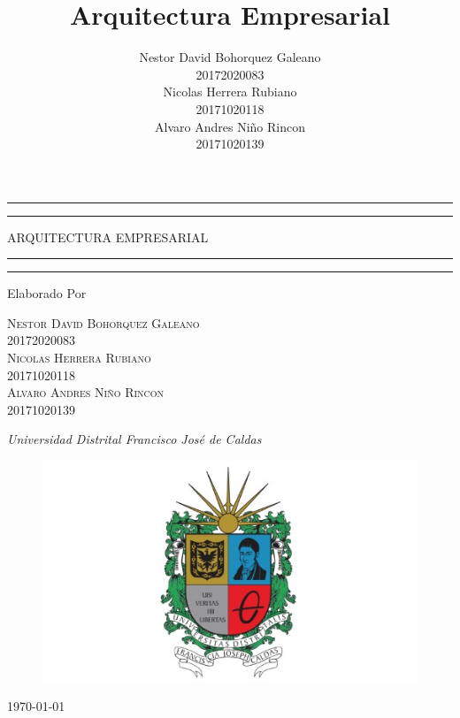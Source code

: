 \documentclass[11pt]{book}
\author{
	Nestor David Bohorquez Galeano \\ 
	20172020083 \\
	Nicolas Herrera Rubiano \\
	20171020118 \\
	Alvaro Andres Niño Rincon \\
	20171020139	
}
\title{Arquitectura Empresarial}
\begin{document}

\begin{titlepage} %
	
	\centering
	\scshape %
	\vspace*{\baselineskip} %
	
	\rule{\textwidth}{1.6pt}\vspace*{-\baselineskip}\vspace*{2pt} %
	\rule{\textwidth}{0.4pt} %
	
	\vspace{0.75\baselineskip}
	
	{\LARGE ARQUITECTURA EMPRESARIAL} %
	
	\vspace{0.75\baselineskip}
	
	\rule{\textwidth}{0.4pt}\vspace*{-\baselineskip}\vspace{3.2pt} %
	\rule{\textwidth}{1.6pt} %
	
	\vspace{2\baselineskip}
	
	\vspace*{3\baselineskip}
	
	Elaborado Por
	
	\vspace{0.5\baselineskip} 
	
	{\scshape\Large Nestor David Bohorquez Galeano \\ 20172020083 \\ 
	Nicolas Herrera Rubiano \\ 20171020118 \\ 
	Alvaro Andres Niño Rincon \\ 20171020139}
	
	\vspace{0.5\baselineskip} 
	
	\textit{Universidad Distrital Francisco José de Caldas}
	
	\vfill 
	
	\begin{figure}[h!]
		\centering
		\includegraphics[width=0.3\linewidth]{imgs/ud.jpeg}
	\end{figure}
	
	\today
\end{titlepage}
\end{document}
